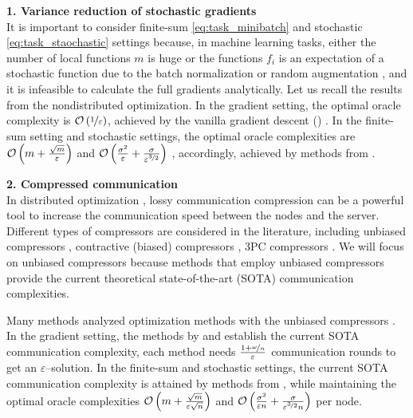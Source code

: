 \documentclass{article}
\begin{document}
\textbf{1. Variance reduction of stochastic gradients}\\
It is important to consider finite-sum \eqref{eq:task_minibatch} and stochastic \eqref{eq:task_staochastic} settings because, in machine learning tasks, either the number of local functions $m$ is huge or the functions $f_i$ is an expectation of a stochastic function due to the batch normalization \citep{ioffe2015batch} or random augmentation \citep{goodfellow2016deep}, and it is infeasible to calculate the full gradients analytically. Let us recall the results from the nondistributed optimization. In the gradient setting, the optimal oracle complexity is $\mathcal{O}\left(\nicefrac{1}{\varepsilon}\right)$, achieved by the vanilla gradient descent () \citep{carmon2020lower, nesterov2018lectures}. In the finite-sum setting and stochastic settings, the optimal oracle complexities are $\mathcal{O}\left(m + \frac{\sqrt{m}}{\varepsilon}\right)$ and $\mathcal{O}\left(\frac{\sigma^2}{\varepsilon} + \frac{\sigma}{\varepsilon^{\nicefrac{3}{2}}}\right)$ \citep{SPIDER, PAGE, arjevani2019lower}, accordingly, achieved by methods from \citep{SPIDER,SARAH,PAGE}. 

\textbf{2. Compressed communication} \\
In distributed optimization \citep{ramesh2021zero, xu2021grace}, lossy communication compression can be a powerful tool to increase the communication speed between the nodes and the server. Different types of compressors are considered in the literature, including unbiased compressors \citep{alistarh2017qsgd,beznosikov2020biased,szlendak2021permutation}, contractive (biased) compressors \citep{EF21}, 3PC compressors \citep{richtarik20223pc}. We will focus on unbiased compressors because methods \citep{tyurin2022dasha, szlendak2021permutation, MARINA} that employ unbiased compressors provide the current theoretical state-of-the-art (SOTA) communication complexities.

Many methods analyzed optimization methods with the unbiased compressors \citep{alistarh2017qsgd, DIANA, horvath2019stochastic, gorbunov2021marina, tyurin2022dasha}. In the gradient setting, the methods by \cite{tyurin2022dasha} and \cite{MARINA} establish the current SOTA communication complexity, each method needs $\frac{1 + \nicefrac{\omega}{n}}{\varepsilon}$ communication rounds to get an $\varepsilon$--solution. In the finite-sum and stochastic settings, the current SOTA communication complexity is attained by methods from \citep{tyurin2022dasha}, while maintaining the optimal oracle complexities $\mathcal{O}\left(m + \frac{\sqrt{m}}{\varepsilon \sqrt{n}}\right)$ and $\mathcal{O}\left(\frac{\sigma^2}{\varepsilon n} + \frac{\sigma}{\varepsilon^{\nicefrac{3}{2}} n}\right)$ per node.
\end{document}

